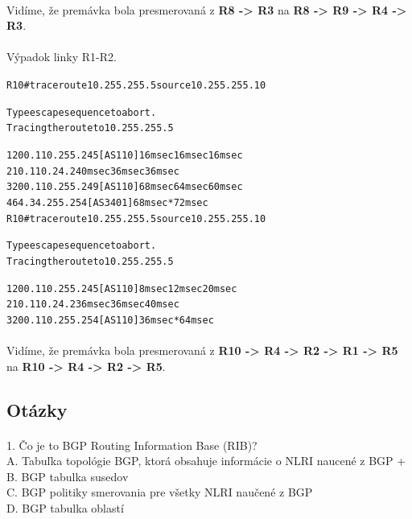 \documentclass[12pt,twoside,a4paper]{report}
\begin{document}
\paragraph{}
Vidíme, že premávka bola presmerovaná z \textbf{R8 -\textgreater{} R3} na \textbf{R8 -\textgreater{} R9 -\textgreater{} R4 -\textgreater{} R3}.

\paragraph{}
Výpadok linky R1-R2.

\noindent
{\selectfont
\begin{small}
\begin{alltt}
R10#traceroute 10.255.255.5 source 10.255.255.10

Type escape sequence to abort.
Tracing the route to 10.255.255.5

  1 200.110.255.245 [AS 110] 16 msec 16 msec 16 msec
  2 10.110.24.2 40 msec 36 msec 36 msec
  3 200.110.255.249 [AS 110] 68 msec 64 msec 60 msec
  4 64.34.255.254 [AS 3401] 68 msec *  72 msec
R10#traceroute 10.255.255.5 source 10.255.255.10

Type escape sequence to abort.
Tracing the route to 10.255.255.5

  1 200.110.255.245 [AS 110] 8 msec 12 msec 20 msec
  2 10.110.24.2 36 msec 36 msec 40 msec
  3 200.110.255.254 [AS 110] 36 msec *  64 msec
\end{alltt}
\end{small}
}

\paragraph{}
Vidíme, že premávka bola presmerovaná z \textbf{R10 -\textgreater{} R4 -\textgreater{} R2 -\textgreater{} R1 -\textgreater{} R5} na \textbf{R10 -\textgreater{} R4 -\textgreater{} R2 -\textgreater{} R5}.

\subsection{Otázky}
\paragraph{}
1. Čo je to BGP Routing Information Base (RIB)?\\
A. Tabuľka topológie BGP, ktorá obsahuje informácie o NLRI naucené z BGP +\\
B. BGP tabulka susedov\\
C. BGP politiky smerovania pre všetky NLRI naučené z BGP\\
D. BGP tabulka oblastí \\
\end{document}
